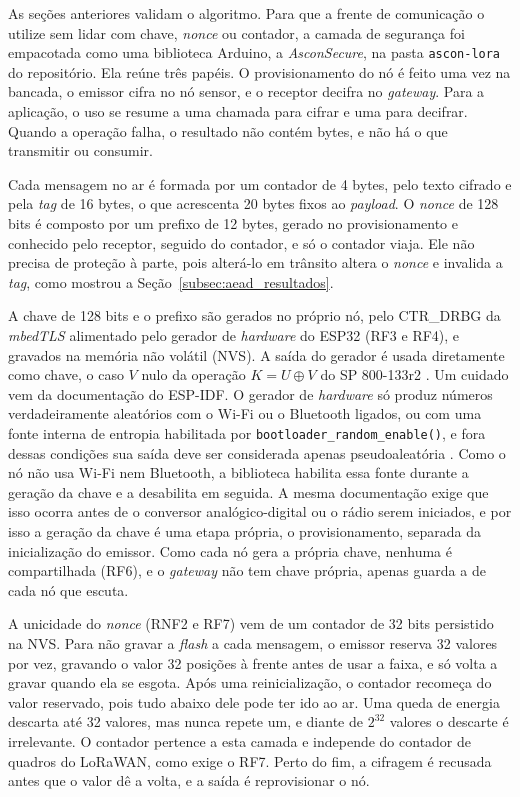 As seções anteriores validam o algoritmo. Para que a frente de comunicação o utilize sem lidar com chave, \textit{nonce} ou contador, a camada de segurança foi empacotada como uma biblioteca Arduino, a \textit{AsconSecure}, na pasta \texttt{ascon-lora} do repositório. Ela reúne três papéis. O provisionamento do nó é feito uma vez na bancada, o emissor cifra no nó sensor, e o receptor decifra no \textit{gateway}. Para a aplicação, o uso se resume a uma chamada para cifrar e uma para decifrar. Quando a operação falha, o resultado não contém bytes, e não há o que transmitir ou consumir.

Cada mensagem no ar é formada por um contador de 4 bytes, pelo texto cifrado e pela \textit{tag} de 16 bytes, o que acrescenta 20 bytes fixos ao \textit{payload}. O \textit{nonce} de 128 bits é composto por um prefixo de 12 bytes, gerado no provisionamento e conhecido pelo receptor, seguido do contador, e só o contador viaja. Ele não precisa de proteção à parte, pois alterá-lo em trânsito altera o \textit{nonce} e invalida a \textit{tag}, como mostrou a Seção~\ref{subsec:aead_resultados}.

A chave de 128 bits e o prefixo são gerados no próprio nó, pelo CTR\_DRBG da \textit{mbedTLS} alimentado pelo gerador de \textit{hardware} do ESP32 (RF3 e RF4), e gravados na memória não volátil (NVS). A saída do gerador é usada diretamente como chave, o caso $V$ nulo da operação $K = U \oplus V$ do SP 800-133r2 \cite{barker2020nist133}. Um cuidado vem da documentação do ESP-IDF. O gerador de \textit{hardware} só produz números verdadeiramente aleatórios com o Wi-Fi ou o Bluetooth ligados, ou com uma fonte interna de entropia habilitada por \texttt{bootloader\_random\_enable()}, e fora dessas condições sua saída deve ser considerada apenas pseudoaleatória \cite{espressif2026random}. Como o nó não usa Wi-Fi nem Bluetooth, a biblioteca habilita essa fonte durante a geração da chave e a desabilita em seguida. A mesma documentação exige que isso ocorra antes de o conversor analógico-digital ou o rádio serem iniciados, e por isso a geração da chave é uma etapa própria, o provisionamento, separada da inicialização do emissor. Como cada nó gera a própria chave, nenhuma é compartilhada (RF6), e o \textit{gateway} não tem chave própria, apenas guarda a de cada nó que escuta.

A unicidade do \textit{nonce} (RNF2 e RF7) vem de um contador de 32 bits persistido na NVS. Para não gravar a \textit{flash} a cada mensagem, o emissor reserva 32 valores por vez, gravando o valor 32 posições à frente antes de usar a faixa, e só volta a gravar quando ela se esgota. Após uma reinicialização, o contador recomeça do valor reservado, pois tudo abaixo dele pode ter ido ao ar. Uma queda de energia descarta até 32 valores, mas nunca repete um, e diante de $2^{32}$ valores o descarte é irrelevante. O contador pertence a esta camada e independe do contador de quadros do LoRaWAN, como exige o RF7. Perto do fim, a cifragem é recusada antes que o valor dê a volta, e a saída é reprovisionar o nó.

